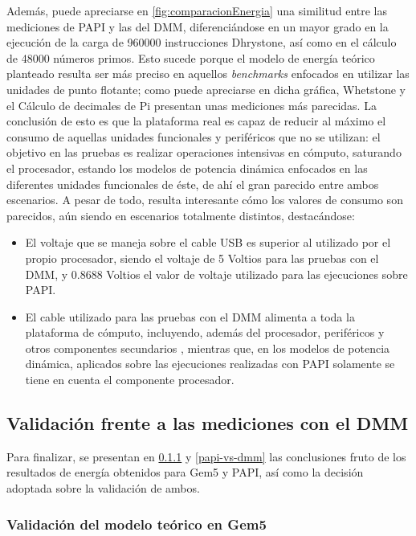 Además, puede apreciarse en \ref{fig:comparacionEnergia} una similitud entre las mediciones de PAPI y las del DMM, diferenciándose en un mayor grado en la ejecución de la carga de 960000 instrucciones Dhrystone, así como en el cálculo de 48000 números primos. Esto sucede porque el modelo de energía teórico planteado resulta ser más preciso en aquellos \textit{benchmarks} enfocados en utilizar las unidades de punto flotante; como puede apreciarse en dicha gráfica, Whetstone y el Cálculo de decimales de Pi presentan unas mediciones más parecidas. La conclusión de esto es que la plataforma real es capaz de reducir al máximo el consumo de aquellas unidades funcionales y periféricos que no se utilizan: el objetivo en las pruebas es realizar operaciones intensivas en cómputo, saturando el procesador, estando los modelos de potencia dinámica enfocados en las diferentes unidades funcionales de éste, de ahí el gran parecido entre ambos escenarios. A pesar de todo, resulta interesante cómo los valores de consumo son parecidos, aún siendo en escenarios totalmente distintos, destacándose:

\begin{itemize}
    \item El voltaje que se maneja sobre el cable \ac{USB} es superior al utilizado por el propio procesador, siendo el voltaje de 5 Voltios para las pruebas con el DMM, y 0.8688 Voltios el valor de voltaje utilizado para las ejecuciones sobre PAPI. 
    
    \item El cable utilizado para las pruebas con el DMM alimenta a toda la plataforma de cómputo, incluyendo, además del procesador, periféricos y otros componentes secundarios \cite{schematics-rpi}, mientras que, en los modelos de potencia dinámica, aplicados sobre las ejecuciones realizadas con PAPI solamente se tiene en cuenta el componente procesador.
\end{itemize}

\subsection{Validación frente a las mediciones con el DMM}

Para finalizar, se presentan en \ref{gem5-vs-dmm} y \ref{papi-vs-dmm} las conclusiones fruto de los resultados de energía obtenidos para Gem5 y PAPI, así como la decisión adoptada sobre la validación de ambos.

\subsubsection{Validación del modelo teórico en Gem5}
\label{gem5-vs-dmm}

